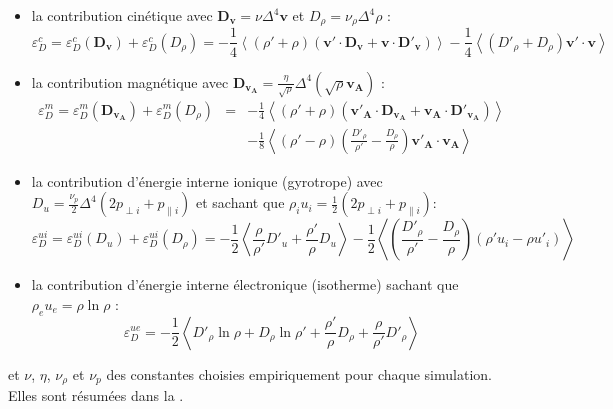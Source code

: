  \begin{itemize}
     \item la contribution cinétique avec $\boldsymbol{D}_{\boldsymbol{v}} = \nu \Delta^4 \boldsymbol{v} $ et $D_{\rho} = \nu_{\rho} \Delta^4 \rho $ :
     \begin{equation}
         \varepsilon^{c}_{D} = \varepsilon^{c}_{D}(\boldsymbol{D_{v}}) + \varepsilon^{c}_{D}(D_{\rho})=   - \frac{1}{4} \left< \left(\rho'+\rho\right) \left(\boldsymbol{v'} \cdot  \boldsymbol{D_{\boldsymbol{v}}} + \boldsymbol{v} \cdot   \boldsymbol{D'_{\boldsymbol{v}}}  \right)\right>   - \frac{1}{4} \left<  \left(D'_{\rho}+D_{\rho}\right)  \boldsymbol{v'} \cdot  \boldsymbol{v}\right> 
     \end{equation}
     \item la contribution magnétique avec $\boldsymbol{D_{v_A}} = \frac{\eta}{\sqrt{\rho}} \Delta^4 (\sqrt{\rho} \boldsymbol{v_A})$ :
     \begin{eqnarray}
         \varepsilon^{m}_{D} = \varepsilon^{m}_{D}(\boldsymbol{D_{v_A}}) + \varepsilon^{m}_{D}(D_{\rho})&=& - \frac{1}{4} \left< \left(\rho'+\rho\right) \left(\boldsymbol{v'_A} \cdot  \boldsymbol{D_{v_A}} + \boldsymbol{v_A} \cdot   \boldsymbol{D'_{v_A}}  \right) \right>\nonumber \\
         &&- \frac{1}{8} \left<\left(\rho'-\rho\right) \left(\frac{D'_{\rho}}{\rho'}-\frac{D_{\rho}}{\rho}\right) \boldsymbol{v'_A} \cdot  \boldsymbol{v_A} \right>
     \end{eqnarray}  
     \item la contribution d'énergie interne ionique (gyrotrope) avec $D_u =  \frac{\nu_p}{2} \Delta^4 (2p_{\perp i } + p_{\parallel i })$ et sachant que $ \rho_i u_i = \frac{1}{2} (2 p_{\perp i } + p_{\parallel i })$:
     \begin{equation}
         \varepsilon^{ui}_{D} = \varepsilon^{ui}_{D}(D_u) + \varepsilon^{ui}_{D}(D_{\rho})=   - \frac{1}{2} \left<  \frac{\rho}{\rho'} D'_u +  \frac{\rho'}{\rho} D_u \right>- \frac{1}{2} \left< \left(\frac{ D'_{\rho}}{\rho'} - \frac{D_{\rho}}{\rho} \right)\left( \rho' u_i  -  \rho u'_i \right)   \right>  
     \end{equation}
     \item la contribution d'énergie interne électronique (isotherme) sachant que  $\rho_e u_e = \rho \ln \rho$ :
     \begin{equation}
         \varepsilon^{ue}_{D} =   - \frac{1}{2} \left<  D'_{\rho} \ln \rho +  D_{\rho} \ln \rho' +  \frac{\rho'}{\rho} D_{\rho} + \frac{\rho}{\rho'} D'_{\rho} \right>  
     \end{equation}
 \end{itemize}
et $\nu$, $\eta$, $\nu_{\rho}$ et $\nu_p$ des constantes choisies empiriquement pour chaque simulation. Elles sont résumées dans la .

